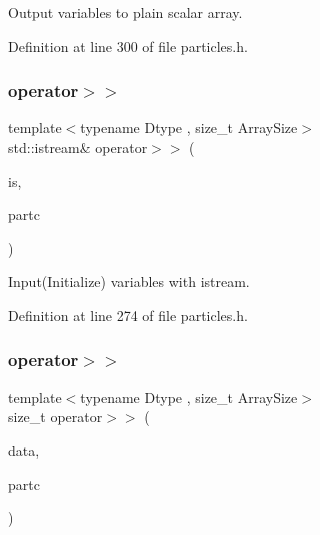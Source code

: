 Output variables to plain scalar array. 



Definition at line 300 of file particles.\+h.

\mbox{\label{class_vel_dep_particles_a1c8e1f97848175d472220a784c186c6a}} 
\subsubsection{\texorpdfstring{operator$>$$>$}{operator>>}\hspace{0.1cm}{\footnotesize\ttfamily [1/2]}}
{\footnotesize\ttfamily template$<$typename Dtype , size\+\_\+t Array\+Size$>$ \\
std\+::istream\& operator$>$$>$ (\begin{DoxyParamCaption}\item[{std\+::istream \&}]{is,  }\item[{\mbox{\hyperlink{class_vel_dep_particles}{Vel\+Dep\+Particles}}$<$ Dtype, Array\+Size $>$ \&}]{partc }\end{DoxyParamCaption})\hspace{0.3cm}{\ttfamily [friend]}}



Input(\+Initialize) variables with istream. 



Definition at line 274 of file particles.\+h.

\mbox{\label{class_vel_dep_particles_a42b55c53ca0dd6ae07eb76547847a24b}} 
\subsubsection{\texorpdfstring{operator$>$$>$}{operator>>}\hspace{0.1cm}{\footnotesize\ttfamily [2/2]}}
{\footnotesize\ttfamily template$<$typename Dtype , size\+\_\+t Array\+Size$>$ \\
size\+\_\+t operator$>$$>$ (\begin{DoxyParamCaption}\item[{\mbox{\hyperlink{class_vel_indep_particles_a6bba8ac3f941a144214037a27ccaa119}{Dyn\+Scalar\+Array}} \&}]{data,  }\item[{\mbox{\hyperlink{class_vel_dep_particles}{Vel\+Dep\+Particles}}$<$ Dtype, Array\+Size $>$ \&}]{partc }\end{DoxyParamCaption})\hspace{0.3cm}{\ttfamily [friend]}}



